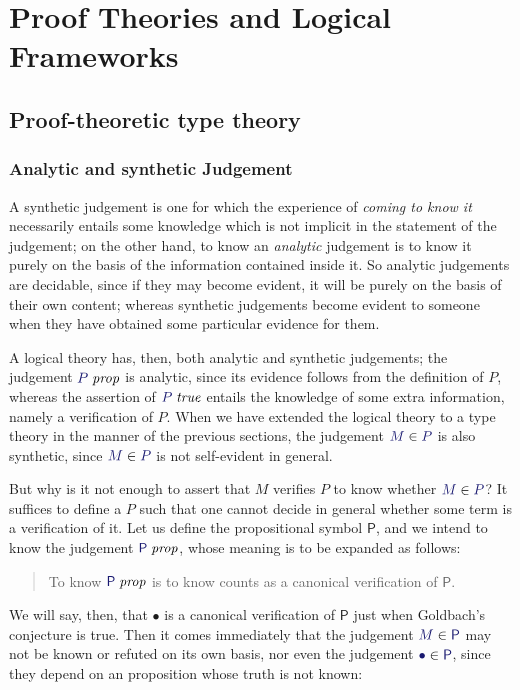 \documentclass[main.tex]{subfiles}
\begin{document}
\onehalfspacing

\chapter{Proof Theories and Logical Frameworks}

\section{Proof-theoretic type theory}

\subsection{Analytic and synthetic Judgement}

A synthetic judgement is one for which the experience of \emph{coming
to know it} necessarily entails some knowledge which is not implicit
in the statement of the judgement; on the other hand, to know an
\emph{analytic} judgement is to know it purely on the basis of the
information contained inside it. So analytic judgements are decidable,
since if they may become evident, it will be purely on the basis of
their own content; whereas synthetic judgements become evident to
someone when they have obtained some particular evidence for them.

A logical theory has, then, both analytic and synthetic judgements;
the judgement $\isprop{P}$ is analytic, since its evidence follows
from the definition of $P$, whereas the assertion of $\istrue{P}$
entails the knowledge of some extra information, namely a verification
of $P$. When we have extended the logical theory to a type theory in
the manner of the previous sections, the judgement $\ver{M}{P}$ is
also synthetic, since $\ver{M}{P}$ is not self-evident in general.

But why is it not enough to assert that $M$ verifies $P$ to know
whether $\ver{M}{P}$? It suffices to define a $P$ such that one cannot
decide in general whether some term is a verification of it. Let us
define the propositional symbol $\mathsf{P}$, and we intend to know
the judgement $\isprop{\mathsf{P}}$, whose meaning is to be expanded as
follows:
\begin{quote}
  To know $\isprop{\mathsf{P}}$ is to know counts as a canonical verification of $\mathsf{P}$.
\end{quote}

We will say, then, that $\bullet$ is a canonical verification of
$\mathsf{P}$ just when Goldbach's conjecture is true. Then it comes
immediately that the judgement $\ver{M}{\mathsf{P}}$ may not be known
or refuted on its own basis, nor even the judgement
$\ver{\bullet}{\mathsf{P}}$, since they depend on an proposition whose
truth is not known:
\end{document}
